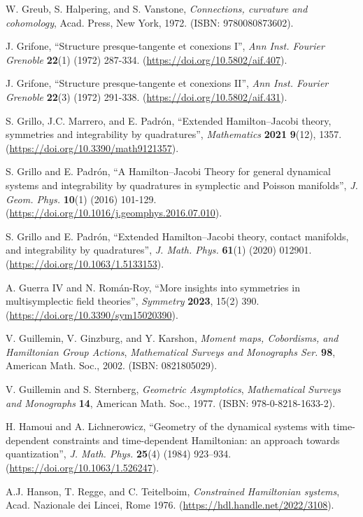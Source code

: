\documentclass[12pt]{report}
\begin{document}
\begin{thebibliography}{999}
W. Greub, S. Halpering, and S. Vanstone, 
{\it Connections, curvature and cohomology}, 
Acad. Press, New York, 1972.
(ISBN: 9780080873602).

J. Grifone,
``Structure presque-tangente et conexions I'',
{\sl Ann Inst. Fourier Grenoble} {\bf 22}(1) (1972) 287-334.
(\url{https://doi.org/10.5802/aif.407}).

J. Grifone,
``Structure presque-tangente et conexions II'',
{\sl Ann Inst. Fourier Grenoble} {\bf 22}(3) (1972) 291-338.
(\url{https://doi.org/10.5802/aif.431}).

S. Grillo, J.C. Marrero, and E. Padr\'on,
``Extended Hamilton–Jacobi theory, symmetries and integrability by quadratures'', 
{\sl Mathematics} {\bf 2021} {\bf 9}(12), 1357.  (\url{https://doi.org/10.3390/math9121357}).

S. Grillo and E. Padr\'on,
``A Hamilton--Jacobi Theory for general dynamical systems and integrability by quadratures in symplectic and Poisson manifolds'',
{\sl J. Geom. Phys.} {\bf 10}(1) (2016) 101-129.
(\url{https://doi.org/10.1016/j.geomphys.2016.07.010}).

S. Grillo and E. Padr\'on,
``Extended Hamilton--Jacobi theory, contact manifolds, and integrability by quadratures'',
{\sl J. Math. Phys.} {\bf 61}(1) (2020) 012901.
\newblock (\url{https://doi.org/10.1063/1.5133153}).

A. Guerra IV and N. Rom\'an-Roy,
``More insights into symmetries in multisymplectic field theories'',
{\sl Symmetry} {\bf 2023}, 15(2) 390. (\url{https://doi.org/10.3390/sym15020390}).

V. Guillemin, V. Ginzburg, and Y. Karshon,
{\it Moment maps, Cobordisms, and Hamiltonian Group Actions},
{\sl Mathematical Surveys and Monographs Ser.} {\bf 98},
American Math. Soc., 2002.
(ISBN: 0821805029).

V. Guillemin and S. Sternberg,
{\it Geometric Asymptotics},
{\sl Mathematical Surveys and Monographs} {\bf 14},
American Math. Soc., 1977.
(ISBN: 978-0-8218-1633-2).

H. Hamoui and A. Lichnerowicz,
``Geometry of the dynamical systems with time-dependent constraints and time-dependent Hamiltonian: an approach towards quantization'',
{\sl J. Math. Phys.} {\bf 25}(4) (1984) 923--934.
(\url{https://doi.org/10.1063/1.526247}).

A.J. Hanson, T. Regge, and C. Teitelboim,
{\it Constrained Hamiltonian systems},
Acad. Nazionale dei Lincei, Rome 1976.
(\url{https://hdl.handle.net/2022/3108}).


\end{thebibliography}
\end{document}
